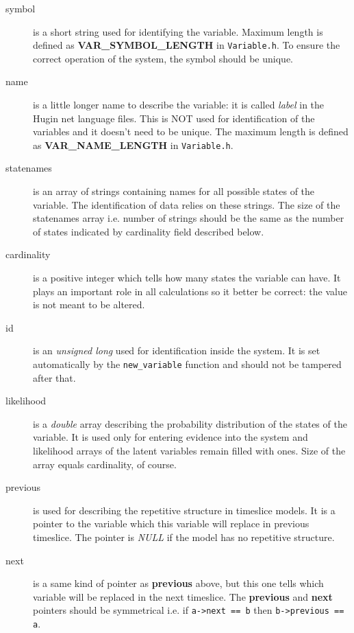 \documentclass[12pt,a4paper]{report}
\newcommand{\cdatatype}[1]{{\it #1}}
\newcommand{\examplecode}[1]{\texttt{#1}}
\newcommand{\cfilename}[1]{\texttt{#1}}
\newcommand{\cdefine}[1]{\textbf{#1}}
\newcommand{\cstructfield}[1]{\textbf{#1}}
\newcommand{\cfunction}[1]{\texttt{#1}}
\begin{document}
\begin{description}
\item[symbol] is a short string used for identifying the variable. Maximum
length is defined as \cdefine{VAR\_SYMBOL\_LENGTH} in
\cfilename{Variable.h}. To ensure the correct operation of the system, the 
symbol should be unique.

\item[name] is a little longer name to describe the variable: it is
called {\it label} in the Hugin net language files. This is NOT used for 
identification of the variables and it doesn't need to be unique. 
The maximum length is defined as \cdefine{VAR\_NAME\_LENGTH} in 
\cfilename{Variable.h}.

\item[statenames] is an array of strings containing names for all
possible states of the variable. The identification of data relies on
these strings. The size of the statenames array i.e. number of
strings should be the same as the number of states indicated by
cardinality field described below.

\item[cardinality] is a positive integer which tells how many states
the variable can have. It plays an important role in all calculations
so it better be correct: the value is not meant to be altered.

\item[id] is an \cdatatype{unsigned long} used for identification
inside the system. It is set automatically by the \cfunction{new\_variable} 
function and should not be tampered after that.

\item[likelihood] is a \cdatatype{double} array describing the probability
distribution of the states of the variable. It is used only for
entering evidence into the system and likelihood arrays of the latent
variables remain filled with ones. Size of the array equals
cardinality, of course.

\item[previous] is used for describing the repetitive structure in
timeslice models. It is a pointer to the variable which this variable
will replace in previous timeslice. The pointer is \cdatatype{NULL} if 
the model has no repetitive structure.

\item[next] is a same kind of pointer as \cstructfield{previous} above, 
but this one tells which variable will be replaced in the next timeslice.
The \cstructfield{previous} and \cstructfield{next} pointers should be 
symmetrical i.e. if \examplecode{a->next == b} then 
\examplecode{b->previous == a}.
\end{description}
\end{document}
